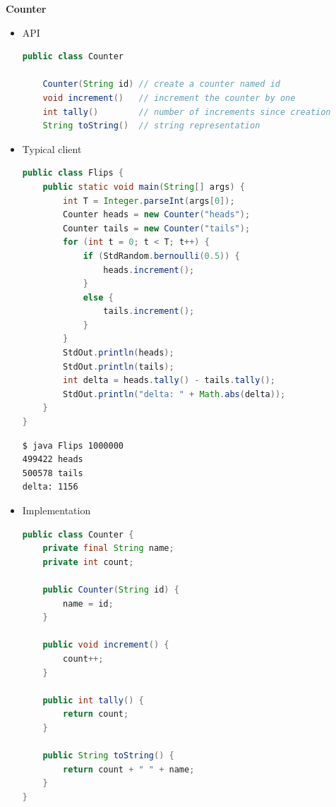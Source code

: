\documentclass[8pt,a4paper,compress]{beamer}
\begin{document}
\begin{frame}[fragile]
\pause

\textbf{Counter}
\begin{itemize}
\item API
\begin{lstlisting}[language=Java]
public class Counter

    Counter(String id) // create a counter named id
    void increment()   // increment the counter by one
    int tally()        // number of increments since creation
    String toString()  // string representation
\end{lstlisting}

\pause
\item Typical client
\begin{lstlisting}[language=Java]
public class Flips {
    public static void main(String[] args) {
        int T = Integer.parseInt(args[0]);
        Counter heads = new Counter("heads");
        Counter tails = new Counter("tails");
        for (int t = 0; t < T; t++) {
            if (StdRandom.bernoulli(0.5)) {
                heads.increment();
            }
            else {
                tails.increment();
            }
        }
        StdOut.println(heads);
        StdOut.println(tails);
        int delta = heads.tally() - tails.tally();
        StdOut.println("delta: " + Math.abs(delta));
    }
}
\end{lstlisting}

\begin{lstlisting}[language=bash]
$ java Flips 1000000
499422 heads
500578 tails
delta: 1156
\end{lstlisting}
\end{itemize}
\end{frame}

\begin{frame}[fragile]
\pause

\begin{itemize}
\item Implementation
\begin{lstlisting}[language=Java]
public class Counter {
    private final String name;
    private int count;

    public Counter(String id) { 
        name = id; 
    }

    public void increment() { 
        count++; 
    }

    public int tally() { 
        return count; 
    }

    public String toString() { 
        return count + " " + name; 
    }
}
\end{lstlisting}
\end{itemize}
\end{frame}
\end{document}
